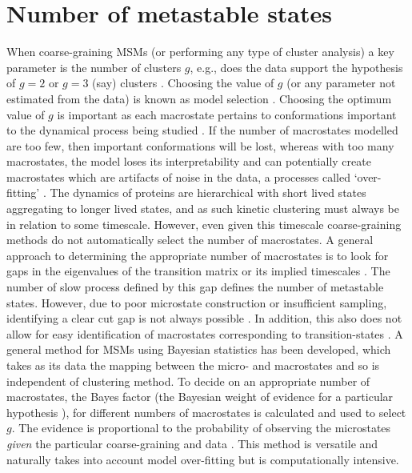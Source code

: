 \section{Number of metastable states}\label{sec:num_metastable}
When coarse-graining MSMs (or performing any type of cluster analysis) a key parameter is the number of clusters $g$, e.g., does the data support the hypothesis of $g=2$ or $g=3$ (say) clusters \cite{milliganExaminationProceduresDetermining1985}. Choosing the value of $g$ (or any parameter not estimated from the data) is known as model selection \cite[chapter 7]{friedman2001elements}. Choosing the optimum value of $g$ is important as each macrostate pertains to conformations important to the dynamical process being studied \cite{frauenfelderEnergyLandscapesMotions1991}. If the number of macrostates modelled are too few, then important conformations will be lost, whereas with too many macrostates, the model loses its interpretability and can potentially  create macrostates which are artifacts of noise in the data, a processes called `over-fitting' \cite[chapter 7]{friedman2001elements}. The dynamics of proteins are hierarchical \cite{frauenfelderEnergyLandscapesMotions1991} with short lived states aggregating to longer lived states, and as such kinetic clustering must always be in relation to some timescale. However, even given this timescale coarse-graining methods do not automatically select the number of macrostates. A general approach to determining the appropriate number of macrostates is to look for gaps in the eigenvalues of the transition matrix or its implied timescales \cite{prinzMarkovModelsMolecular2011, mcgibbonVariationalCrossvalidationSlow2015, deuflhardIdentificationAlmostInvariant2000a}. The number of slow process defined by this gap defines the number of metastable states. However, due to poor microstate construction or insufficient sampling, identifying a clear cut gap is not always possible \cite{bowmanQuantitativeComparisonAlternative2013}. In addition, this also does not allow for easy identification of macrostates corresponding to transition-states \cite{martiniVariationalIdentificationMarkovian2017}. A general method for MSMs using Bayesian statistics has been developed, which takes as its data the mapping between the micro- and macrostates \cite{bacalladoBayesianComparisonMarkov2009a} and so is independent of clustering method. To decide on an appropriate number of macrostates, the Bayes factor (the Bayesian weight of evidence for a particular hypothesis \cite{kassBayesFactors1995}), for different numbers of macrostates is calculated and used to select $g$. The evidence is proportional to the probability of observing the microstates \emph{given} the particular coarse-graining and data \cite{bacalladoBayesianComparisonMarkov2009a}. This method is versatile and naturally takes into account model over-fitting \cite{bacalladoBayesianComparisonMarkov2009a} but is computationally intensive.  

